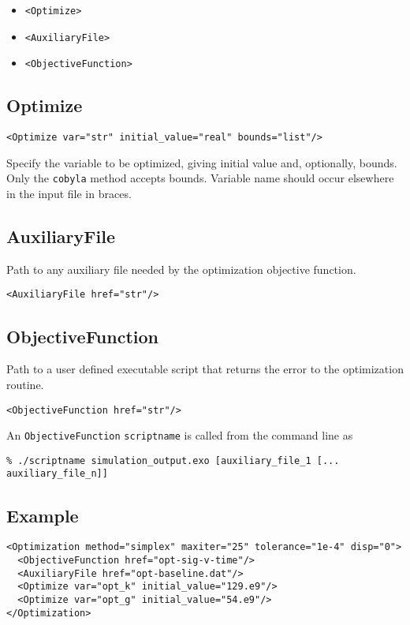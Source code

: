\documentclass[11pt]{report}
\newcommand{\tag}[1]{\texttt{<#1>}}
\begin{document}
\begin{itemize}
  \item \tag{Optimize}
  \item \tag{AuxiliaryFile}
  \item \tag{ObjectiveFunction}
\end{itemize}

\subsection{Optimize}
\begin{verbatim}
<Optimize var="str" initial_value="real" bounds="list"/>
\end{verbatim}
%
Specify the variable to be optimized, giving initial value and, optionally,
bounds.  Only the \texttt{cobyla} method accepts bounds.  Variable name should
occur elsewhere in the input file in braces.

\subsection{AuxiliaryFile}
Path to any auxiliary file needed by the optimization objective function.
\begin{verbatim}
<AuxiliaryFile href="str"/>
\end{verbatim}

\subsection{ObjectiveFunction}
Path to a user defined executable script that returns the error to the
optimization routine.
\begin{verbatim}
<ObjectiveFunction href="str"/>
\end{verbatim}

An \texttt{ObjectiveFunction} \texttt{scriptname} is called from the command
line as
\begin{verbatim}
% ./scriptname simulation_output.exo [auxiliary_file_1 [... auxiliary_file_n]]
\end{verbatim}

\subsection{Example}

\begin{verbatim}
<Optimization method="simplex" maxiter="25" tolerance="1e-4" disp="0">
  <ObjectiveFunction href="opt-sig-v-time"/>
  <AuxiliaryFile href="opt-baseline.dat"/>
  <Optimize var="opt_k" initial_value="129.e9"/>
  <Optimize var="opt_g" initial_value="54.e9"/>
</Optimization>
\end{verbatim}
\end{document}
